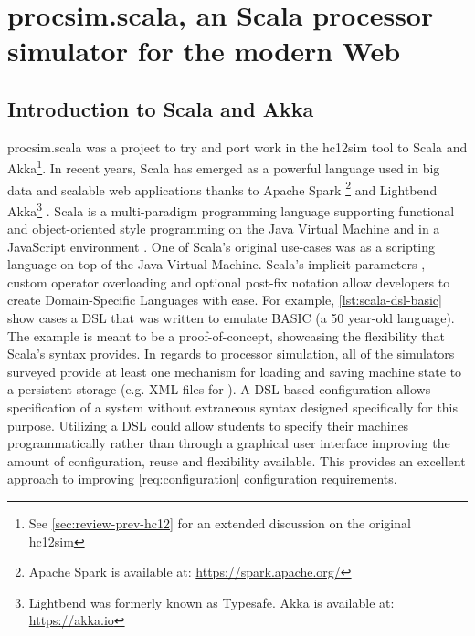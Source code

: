\chapter{procsim.scala, an Scala processor simulator for the modern Web}
\label{ch:akka-lua-configuration}

\newcommand{\scalainline}[1]{\texttt{#1}}
\newcommand{\akkaActor}{\scalainline{Actor}}

\section{Introduction to Scala and Akka}

procsim.scala was a project to try and port work in the hc12sim tool to Scala and Akka\footnote{See \cref{sec:review-prev-hc12} for an extended discussion on the original hc12sim}. In recent years, Scala has emerged as a powerful language used in big data and scalable web applications thanks to Apache Spark \footnote{Apache Spark is available at: \url{https://spark.apache.org/}} and Lightbend Akka\footnote{Lightbend was formerly known as Typesafe. Akka is available at: \url{https://akka.io}} \cite{Karau2015, Alexandrov2014, Singh2015}. Scala is a multi-paradigm programming language supporting functional and object-oriented style programming on the Java Virtual Machine and in a JavaScript environment \cite{Scala-Lang}. One of Scala's original use-cases was as a scripting language on top of the Java Virtual Machine. Scala's implicit parameters \cite{Scala-ImplicitParameters}, custom operator overloading \cite{Scala-Operators} and optional post-fix notation \cite{Scala-MethodInvocations} allow developers to create Domain-Specific Languages with ease. For example, \cref{lst:scala-dsl-basic} show cases a DSL that was written to emulate BASIC (a 50 year-old language). The example is meant to be a proof-of-concept, showcasing the flexibility that Scala's syntax provides. In regards to processor simulation, all of the simulators surveyed provide at least one mechanism for loading and saving machine state to a persistent storage (e.g. XML files for \cite{Skrien2001, Black2013}). A DSL-based configuration allows specification of a system without extraneous syntax designed specifically for this purpose. Utilizing a DSL could allow students to specify their machines programmatically rather than through a graphical user interface improving the amount of configuration, reuse and flexibility available. This provides an excellent approach to improving \cref{req:configuration} configuration requirements.

